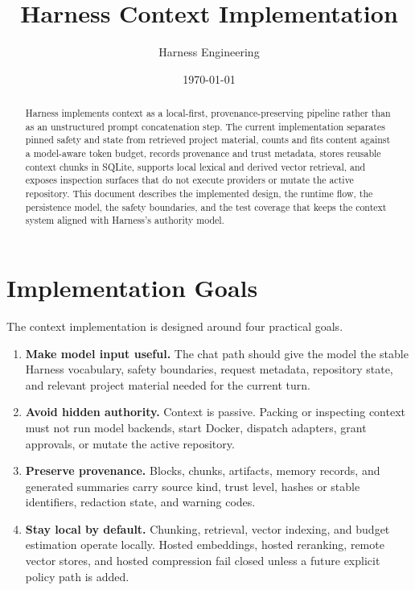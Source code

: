 \documentclass[11pt]{article}
\title{Harness Context Implementation}
\author{Harness Engineering}
\date{\today}
\begin{document}
\maketitle

\begin{abstract}
Harness implements context as a local-first, provenance-preserving pipeline rather than as an unstructured prompt concatenation step. The current implementation separates pinned safety and state from retrieved project material, counts and fits content against a model-aware token budget, records provenance and trust metadata, stores reusable context chunks in SQLite, supports local lexical and derived vector retrieval, and exposes inspection surfaces that do not execute providers or mutate the active repository. This document describes the implemented design, the runtime flow, the persistence model, the safety boundaries, and the test coverage that keeps the context system aligned with Harness's authority model.
\end{abstract}

\section{Implementation Goals}

The context implementation is designed around four practical goals.

\begin{enumerate}[leftmargin=*]
  \item \textbf{Make model input useful.} The chat path should give the model the stable Harness vocabulary, safety boundaries, request metadata, repository state, and relevant project material needed for the current turn.
  \item \textbf{Avoid hidden authority.} Context is passive. Packing or inspecting context must not run model backends, start Docker, dispatch adapters, grant approvals, or mutate the active repository.
  \item \textbf{Preserve provenance.} Blocks, chunks, artifacts, memory records, and generated summaries carry source kind, trust level, hashes or stable identifiers, redaction state, and warning codes.
  \item \textbf{Stay local by default.} Chunking, retrieval, vector indexing, and budget estimation operate locally. Hosted embeddings, hosted reranking, remote vector stores, and hosted compression fail closed unless a future explicit policy path is added.
\end{enumerate}
\end{document}
